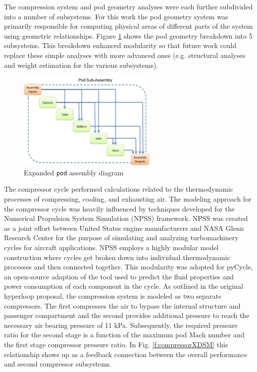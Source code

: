 \documentclass[heading.tex]{subfiles}
\begin{document}
The compression system and pod geometry analyses were each further subdivided into a number of subsystems. For this work the pod geometry 
system was primarily responsible for computing physical areas of different parts of the system using geometric relationships.
 Figure \ref{f:podXDSM} shows the pod geometry breakdown into 5 subsystems.
This breakdown enhanced modularity so that future work could replace these simple analyses with more advanced ones
(e.g. structural analyses and weight estimation for the various subsystems).

\begin{figure}[hbtp]
\centering
\includegraphics[width=0.6\textwidth]{images/podAssembly.png}
\caption{Expanded \texttt{pod} assembly diagram}
\label{f:podXDSM}
\end{figure}

The compressor cycle performed calculations related to the thermodynamic processes of compressing, cooling, and exhausting air. 
The modeling approach for the compressor cycle was heavily influenced by
techniques developed for the Numerical Propulsion System Simulation (NPSS) framework. 
NPSS was created as a joint effort between United States engine manufacturers and NASA Glenn Research Center for the purpose of 
simulating and analyzing turbomachinery cycles for aircraft applications\cite{Lytle}. NPSS employs a highly modular model construction
where cycles get broken down into individual thermodynamic processes and then connected together. 
This modularity was adopted for pyCycle,
an open-source adaption of the tool used to predict the fluid properties and power consumption of each component in the cycle. 
As outlined in the original hyperloop proposal, the compression system is modeled as two separate compressors.
The first compresses the air to bypass the internal structure and passenger compartment
and the second provides additional pressure to reach the necessary air bearing pressure of 11 kPa. 
Subsequently, the required pressure ratio for the second stage is a function of the maximum pod Mach number
and the first stage compressor pressure ratio.
In Fig. \ref{f:compressorXDSM} this relationship shows up as a feedback connection between
the overall performance and second compressor subsystems. 
\end{document}
